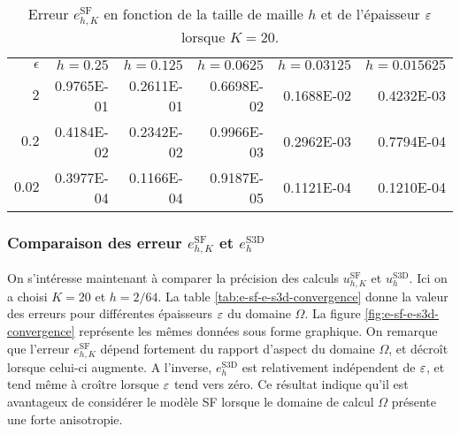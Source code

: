 \begin{table}[h!]
  \caption{Erreur $e_{h,K}^\mathrm{SF}$ en fonction de la taille de
    maille $h$ et de l'épaisseur $\varepsilon$ lorsque $K = 20$.}
  \label{tab:n-h-convergence}
  \begin{center}
    \begin{tabular}{@{}rrrrrr@{}}
      \toprule
      $\epsilon$ & $h = 0.25$ & $h = 0.125$ & $h = 0.0625$ & $h = 0.03125$ & $h = 0.015625$ \\
      \cmidrule{1-6}
      $2$      & \num{0.9765E-01} & \num{0.2611E-01} & \num{0.6698E-02} & \num{0.1688E-02} & \num{0.4232E-03} \\
      $0.2$    & \num{0.4184E-02} & \num{0.2342E-02} & \num{0.9966E-03} & \num{0.2962E-03} & \num{0.7794E-04} \\
      $0.02$   & \num{0.3977E-04} & \num{0.1166E-04} & \num{0.9187E-05} & \num{0.1121E-04} & \num{0.1210E-04} \\
      \bottomrule
    \end{tabular}
  \end{center}
\end{table}

\subsubsection{Comparaison des erreur $e_{h,K}^{\mathrm{SF}}$ et
  $e_h^{\mathrm{S3D}}$} On s'intéresse maintenant à comparer la
précision des calculs $u_{h,K}^\mathrm{SF}$ et
$u_h^{\mathrm{S3D}}$. Ici on a choisi $K = 20$ et $h = 2/64$. La table
\ref{tab:e-sf-e-s3d-convergence} donne la valeur des erreurs pour
différentes épaisseurs $\varepsilon$ du domaine $\Omega$. La figure
\ref{fig:e-sf-e-s3d-convergence} représente les mêmes données sous
forme graphique. On remarque que l'erreur $e_{h,K}^\mathrm{SF}$
dépend fortement du rapport d'aspect du domaine $\Omega$, et
décroît lorsque celui-ci augmente. A l'inverse, $e_h^\mathrm{S3D}$ est
relativement indépendent de $\varepsilon$, et tend même à croître
lorsque $\varepsilon$ tend vers zéro. Ce résultat indique qu'il est
avantageux de considérer le modèle SF lorsque le domaine de calcul
$\Omega$ présente une forte anisotropie.

